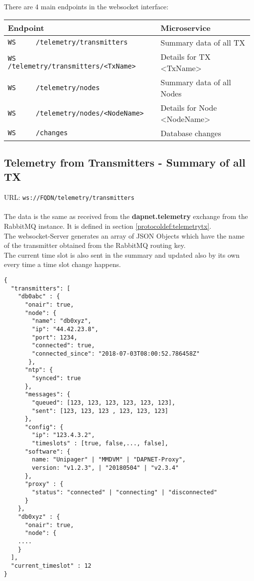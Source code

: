
There are 4 main endpoints in the websocket interface:


\begin{center}
  \begin{tabular}{|l|l|} \hline
    Endpoint & Microservice \\ \hline \hline
    \verb|WS     /telemetry/transmitters| & Summary data of all TX \\ \hline
    \verb|WS     /telemetry/transmitters/<TxName>| & Details for TX <TxName>\\ \hline
    \verb|WS     /telemetry/nodes| & Summary data of all Nodes\\ \hline
    \verb|WS     /telemetry/nodes/<NodeName>| & Details for Node <NodeName>\\ \hline
    \verb|WS     /changes| & Database changes\\ \hline

  \end{tabular}
\end{center}


\subsection{Telemetry from Transmitters - Summary of all TX}
\label{protcoldef:websocketapi:telemetrytxsummary}
URL: \texttt{ws://FQDN/telemetry/transmitters}\\\\

The data is the same as received from the \textbf{dapnet.telemetry} exchange
from the RabbitMQ instance. It is defined in section
\ref{protocoldef:telemetrytx}.\\
The websocket-Server generates an array of JSON Objects which have the name of the transmitter obtained from the RabbitMQ routing key.\\
The current time slot is also sent in the summary and updated also by its own every time a time slot change happens.

\begin{lstlisting}
{
  "transmitters": [
    "db0abc" : {
      "onair": true,
      "node": {
        "name": "db0xyz",
        "ip": "44.42.23.8",
        "port": 1234,
        "connected": true,
        "connected_since": "2018-07-03T08:00:52.786458Z"
       },
      "ntp": {
        "synced": true
      },
      "messages": {
        "queued": [123, 123, 123, 123, 123, 123],
        "sent": [123, 123, 123 , 123, 123, 123]
      },
      "config": {
        "ip": "123.4.3.2",
        "timeslots" : [true, false,...,	false],
      "software": {
        name: "Unipager" | "MMDVM" | "DAPNET-Proxy",
        version: "v1.2.3", | "20180504" | "v2.3.4"
      },
      "proxy" : {
        "status": "connected" | "connecting" | "disconnected"
      }
    },
    "db0xyz" : {
      "onair": true,
      "node": {
    ....
    }        
  ],
  "current_timeslot" : 12
}
\end{lstlisting}

